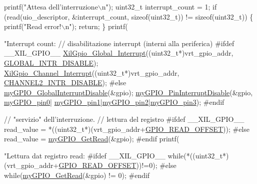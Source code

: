 \begin{DoxyCodeInclude}
{{{{        printf(\textcolor{stringliteral}{"Attesa dell'interruzione\(\backslash\)n"});
        uint32\_t interrupt\_count = 1;
        \textcolor{keywordflow}{if} (read(uio\_descriptor, &interrupt\_count, \textcolor{keyword}{sizeof}(uint32\_t)) != \textcolor{keyword}{sizeof}(uint32\_t)) \{
            printf(\textcolor{stringliteral}{"Read error!\(\backslash\)n"});
            \textcolor{keywordflow}{return};
        \}
        printf(\textcolor{stringliteral}{"Interrupt count: %
        \textcolor{comment}{// disabilitazione interrupt (interni alla periferica)}
\textcolor{preprocessor}{        #ifdef \_\_XIL\_GPIO\_\_}
        \hyperlink{xil__gpio_8c_aac9ff33f07964a1f5f9b8b1173072d67}{XilGpio\_Global\_Interrupt}((uint32\_t*)vrt\_gpio\_addr, 
      \hyperlink{xil__gpio_8h_a893a2062ab316b15fd6bdca35310b86d}{GLOBAL\_INTR\_DISABLE});
        \hyperlink{xil__gpio_8c_ab335ddab38389969b7a1fdb226eb1fbf}{XilGpio\_Channel\_Interrupt}((uint32\_t*)vrt\_gpio\_addr, 
      \hyperlink{xil__gpio_8h_a99ad674322d803e37f8233f207e3d1d1}{CHANNEL2\_INTR\_DISABLE});
\textcolor{preprocessor}{        #else}
        \hyperlink{group__bare-metal_gaacca2871ac57a166e62bf431a2da7548}{myGPIO\_GlobalInterruptDisable}(&gpio);
        \hyperlink{group__bare-metal_ga37d3df33ac50387d6f2e1fb5e2b13e49}{myGPIO\_PinInterruptDisable}(&gpio, \hyperlink{group__bare-metal_gga402a0d20afc0cb7c25554b8b023f4253a6db6fa7be955ae379f543d96122e23a9}{myGPIO\_pin0}|
      \hyperlink{group__bare-metal_gga402a0d20afc0cb7c25554b8b023f4253a1de6bdcc01efca2c39f584f5a20293be}{myGPIO\_pin1}|\hyperlink{group__bare-metal_gga402a0d20afc0cb7c25554b8b023f4253a1fb3f52d920ac8ba17b74dd73c27d783}{myGPIO\_pin2}|\hyperlink{group__bare-metal_gga402a0d20afc0cb7c25554b8b023f4253a4514d64390392b626aa4dbfaac8dc1e5}{myGPIO\_pin3});
\textcolor{preprocessor}{        #endif}

        \textcolor{comment}{// "servizio" dell'interruzione.}
        \textcolor{comment}{// lettura del registro}
\textcolor{preprocessor}{        #ifdef \_\_XIL\_GPIO\_\_}
        read\_value = *((uint32\_t*)(vrt\_gpio\_addr+\hyperlink{xil__gpio_8h_ae5cbf47902785bbcc678bddb8212c86b}{GPIO\_READ\_OFFSET}));
\textcolor{preprocessor}{        #else}
        read\_value = \hyperlink{group__bare-metal_gac35776cd6652f7b932a132f3f6959a11}{myGPIO\_GetRead}(&gpio);
\textcolor{preprocessor}{        #endif}
        printf(\textcolor{stringliteral}{"Lettura dat registro read: %
\textcolor{preprocessor}{        #ifdef \_\_XIL\_GPIO\_\_}
        \textcolor{keywordflow}{while}(*((uint32\_t*)(vrt\_gpio\_addr+\hyperlink{xil__gpio_8h_ae5cbf47902785bbcc678bddb8212c86b}{GPIO\_READ\_OFFSET}))!=0);
\textcolor{preprocessor}{        #else}
        \textcolor{keywordflow}{while}(\hyperlink{group__bare-metal_gac35776cd6652f7b932a132f3f6959a11}{myGPIO\_GetRead}(&gpio) != 0);
\textcolor{preprocessor}{        #endif}

}}}}}}
\end{DoxyCodeInclude}
